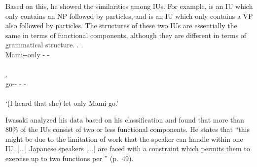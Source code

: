 Based on this,
he showed the similarities among IUs.
For example, 
\Next[a] is an IU which only contains an NP followed by particles, and
\Next[b] is an IU which only contains a VP also followed by particles.
The structures of these two IUs are essentially the same in terms of functional components,
although they are different in terms of grammatical structure.
%
\ex.
 \a.
   \\
        Mami--only - - \\
           \\
 \b.
   \\
         go-- - - \\
            \\
  \glt  `(I heard that she) let only Mami go.'

Iwasaki analyzed his data based on his classification and
found that more than 80\% of the IUs consist of
two or less functional components.
He states that
``this might be due to the limitation of work that the speaker can handle within one IU. [...] Japanese speakers [...] are faced with a constraint which permits them to exercise up to two functions per '' (p.~49).



